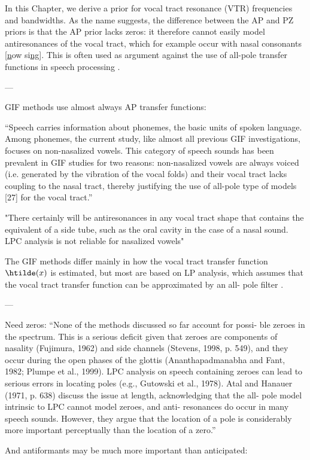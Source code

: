 \begin{chaptersections}{%
In this Chapter, we derive a prior for vocal tract resonance (VTR) frequencies and bandwidths.
}
As the name suggests, the difference between the AP and PZ priors is that the AP prior lacks zeros: it therefore cannot easily model antiresonances of the vocal tract, which for example occur with nasal consonants [\underline{n}ow si\underline{ng}].
This is often used as argument against the use of all-pole transfer functions in speech processing \citep[for example][]{Mehta2012}.

---

GIF methods use almost always AP transfer functions:

``Speech carries information about phonemes, the basic units of spoken language. Among phonemes, the current study, like almost all previous GIF investigations, focuses on non-nasalized vowels. This category of speech sounds has been prevalent in GIF studies for two reasons: non-nasalized vowels are always voiced (i.e. generated by the vibration of the vocal folds) and their vocal tract lacks coupling to the nasal tract, thereby justifying the use of all-pole type of models [27] for the vocal tract.'' \citep{Bleyer2017}

"There certainly will be
antiresonances in any vocal tract shape that contains the equivalent of
a side tube, such as the oral cavity in the case of a nasal sound. LPC
analysis is not reliable for nasalized vowels" \citep[][p.~124]{Maurer2016}

The GIF methods differ mainly in how the vocal tract transfer function $\htilde(x)$ is estimated, but most are based on LP analysis, which assumes that the
vocal tract transfer function can be approximated by an all-
pole filter \cite{Kadiri2021}.

---

Need zeros: ``None of the methods discussed so far account for possi-
ble zeroes in the spectrum. This is a serious deficit given
that zeroes are components of nasality (Fujimura, 1962) and
side channels (Stevens, 1998, p. 549), and they occur during
the open phases of the glottis (Ananthapadmanabha and
Fant, 1982; Plumpe et al., 1999). LPC analysis on speech
containing zeroes can lead to serious errors in locating poles
(e.g., Gutowski et al., 1978). Atal and Hanauer (1971, p.
638) discuss the issue at length, acknowledging that the all-
pole model intrinsic to LPC cannot model zeroes, and anti-
resonances do occur in many speech sounds. However, they
argue that the location of a pole is considerably more
important perceptually than the location of a zero.'' \citep{Whalen2022}

And antiformants may be much more important than anticipated:


\end{chaptersections}
